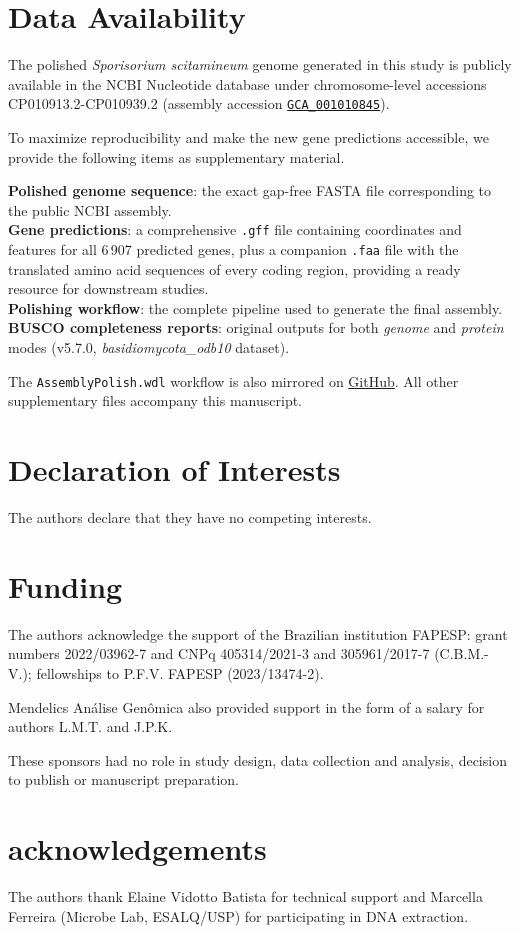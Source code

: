 \documentclass[Journal,letterpaper]{ascelike-new}
\begin{document}
\section*{Data Availability}

The polished \textit{Sporisorium scitamineum} genome generated in this study is publicly available in the NCBI Nucleotide database under chromosome-level accessions CP010913.2-CP010939.2 (assembly accession \href{https://www.ncbi.nlm.nih.gov/datasets/genome/GCA_001010845}{\texttt{GCA\_001010845}}).

To maximize reproducibility and make the new gene predictions accessible, we provide the following items as supplementary material.

\noindent\textbf{Polished genome sequence}: the exact gap-free FASTA file corresponding to the public NCBI assembly.\\
\textbf{Gene predictions}: a comprehensive \texttt{.gff} file containing coordinates and features for all 6\,907 predicted genes, plus a companion \texttt{.faa} file with the translated amino acid sequences of every coding region, providing a ready resource for downstream studies.\\
\textbf{Polishing workflow}: the complete pipeline used to generate the final assembly.\\
\textbf{BUSCO completeness reports}: original outputs for both \textit{genome} and \textit{protein} modes (v5.7.0, \textit{basidiomycota\_odb10} dataset).

The \texttt{AssemblyPolish.wdl} workflow is also mirrored on \href{https://github.com/lmtani/s-scitamineum-pipelines}{GitHub}. All other supplementary files accompany this manuscript.

\section*{Declaration of Interests}

The authors declare that they have no competing interests.

\section*{Funding}

The authors acknowledge the support of the Brazilian institution FAPESP: grant numbers 2022/03962-7 and CNPq 405314/2021-3 and 305961/2017-7 (C.B.M.-V.); fellowships to P.F.V. FAPESP (2023/13474-2).

Mendelics Análise Genômica also provided support in the form of a salary for authors L.M.T. and J.P.K.

These sponsors had no role in study design, data collection and analysis, decision to publish or manuscript preparation.

\section*{acknowledgements}

The authors thank Elaine Vidotto Batista for technical support and Marcella Ferreira (Microbe Lab, ESALQ/USP) for participating in DNA extraction.


\end{document}
